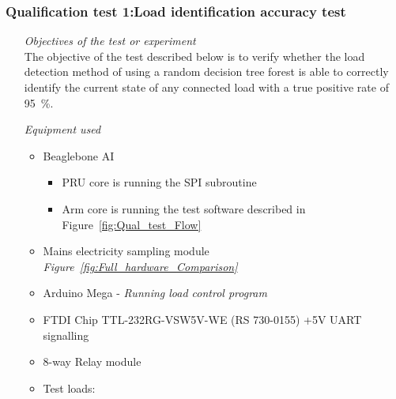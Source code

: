 \subsubsection{Qualification test 1:Load identification accuracy test}
\label{sec:Load_ID_test}
\begin{itemize}
    \item [\emph{Objectives of the test or experiment}]\mbox{}\\
    The objective of the test described below is to verify whether the load detection method of using a random decision tree forest is able to correctly identify the current state of any connected load with a true positive rate of \qty{95}{\percent}.   
    \item [\emph{Equipment used}]\mbox{}
    \begin{itemize} 
        \item Beaglebone AI 
        \begin{itemize}
            \item PRU core is running the SPI subroutine 
            \item Arm core is running the test software described in Figure~\ref{fig:Qual_test_Flow}
        \end{itemize}
        \item Mains electricity sampling module \emph{Figure~\ref{fig:Full_hardware_Comparison}}
        \item Arduino Mega - \emph{Running load control program} 
        \item FTDI Chip TTL-232RG-VSW5V-WE (RS 730-0155) +5V UART signalling
        \item 8-way Relay module
        \item Test loads: \mbox{}
        \begin{table}[H]
        \centering
\end{table}
\end{itemize}
\end{itemize}
